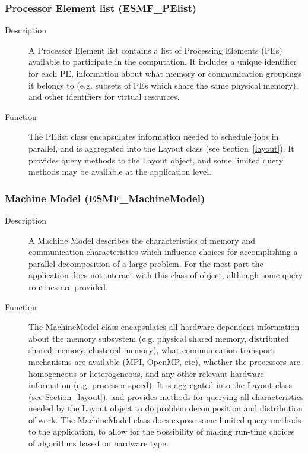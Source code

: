 \subsubsection{Processor Element list (ESMF\_PElist)}
\label{sec:pelist} 
\begin{description}
\item [Description] A Processor Element list contains a list of Processing Elements (PEs) 
available to participate in the computation.  It includes a unique identifier for each PE, 
information about what memory or communication groupings it belongs to (e.g. subsets 
of PEs which share the same physical memory), and other identifiers for virtual resources.  
\item [Function] The PElist class encapsulates information needed to schedule
jobs in parallel, and is aggregated into the Layout class (see Section~\ref{layout}).
It provides query methods to the Layout object, and some limited query methods
may be available at the application level.
\end{description}

\subsubsection{Machine Model (ESMF\_MachineModel)}
\label{sec:machinemodel} 
\begin{description}
\item [Description] A Machine Model describes the characteristics of memory and
communication characteristics which influence choices for accomplishing a parallel 
decomposition of a large problem.  For the most part the application does not
interact with this class of object, although some query routines are provided.
\item [Function] The MachineModel class encapsulates all hardware dependent information
about the memory subsystem (e.g. physical shared memory, distributed shared memory, clustered
memory), what communication transport mechanisms are available (MPI, OpenMP, etc), 
whether the processors are homogeneous or heterogeneous, and 
any other relevant hardware information (e.g. processor speed).
It is aggregated into the Layout class (see Section~\ref{layout}), and provides
methods for querying all characteristics needed by the Layout object to do 
problem decomposition and distribution of work.
The MachineModel class does expose some limited query methods to the application, 
to allow for the possibility of making run-time choices of algorithms based on hardware type.
\end{description}

